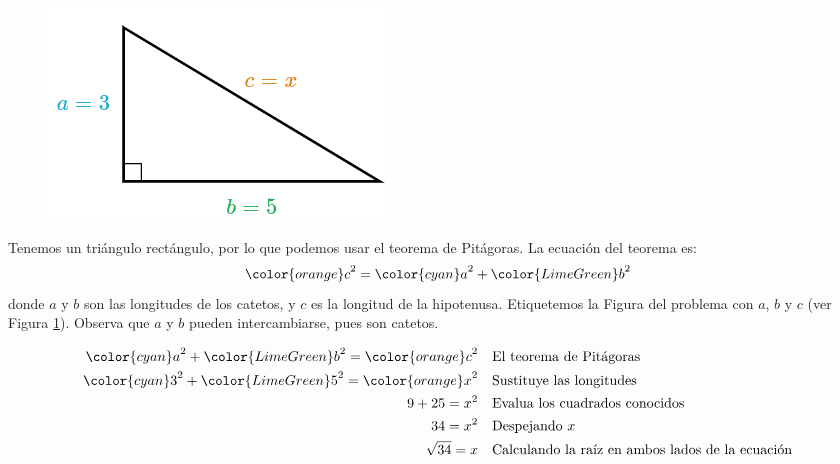 \begin{minipage}[t][][t]{0.6\textwidth}
    \begin{solutionbox}{9cm}
        \begin{minipage}{0.4\textwidth}
            \begin{figure}[H]
                \centering
                \includegraphics[width=0.95\linewidth]{../images/lados_pitagoras_14a.png}
                \caption{}
                \label{fig:lados_pitagoras_14a}
            \end{figure}
        \end{minipage}\hfill
        \begin{minipage}{0.55\textwidth}
            Tenemos un triángulo rectángulo, por lo que podemos usar el teorema de Pitágoras.
            La ecuación del teorema es:
            \[{\color{orange}c}^2={\color{cyan}a}^2+{\color{LimeGreen}b}^2\]
            donde $a$ y $b$ son las longitudes de los catetos, y $c$ es la longitud de la hipotenusa.
            Etiquetemos la Figura del problema con $a$, $b$ y $c$ (ver Figura \ref{fig:lados_pitagoras_14a}).
            Observa que $a$ y $b$ pueden intercambiarse, pues son catetos.
        \end{minipage}
        \begin{align*}
            {\color{cyan}a}^2+{\color{LimeGreen}b}^2  ={\color{orange}c}^2 & \text{\quad El teorema de Pitágoras}                          \\
            {\color{cyan}3}^2+{\color{LimeGreen}5}^2  ={\color{orange}x}^2 & \text{\quad Sustituye las longitudes}                         \\
            9+25   =x^2                                                    & \text{\quad Evalua los cuadrados conocidos}                   \\
            34=x^2                                                         & \text{\quad Despejando } x                                    \\
            \sqrt{34}=x                                                    & \text{\quad Calculando la raíz en ambos lados de la ecuación} \\
        \end{align*}
    \end{solutionbox}
\end{minipage}
